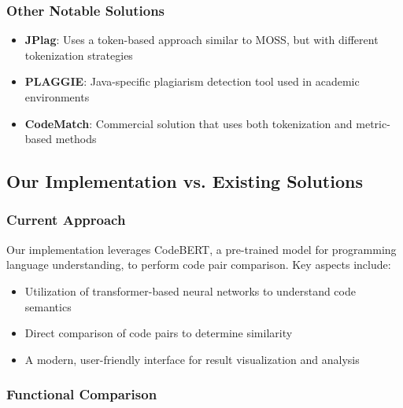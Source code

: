 \documentclass[12pt, titlepage]{article}
\begin{document}
\subsubsection{Other Notable Solutions}
\begin{itemize}
    \item \textbf{JPlag}: Uses a token-based approach similar to MOSS, but with different tokenization strategies
    \item \textbf{PLAGGIE}: Java-specific plagiarism detection tool used in academic environments
    \item \textbf{CodeMatch}: Commercial solution that uses both tokenization and metric-based methods
\end{itemize}

\subsection{Our Implementation vs. Existing Solutions}

\subsubsection{Current Approach}
Our implementation leverages CodeBERT, a pre-trained model for programming language understanding, to perform code pair comparison. Key aspects include:
\begin{itemize}
    \item Utilization of transformer-based neural networks to understand code semantics
    \item Direct comparison of code pairs to determine similarity
    \item A modern, user-friendly interface for result visualization and analysis
\end{itemize}

\subsubsection{Functional Comparison}
\end{document}
